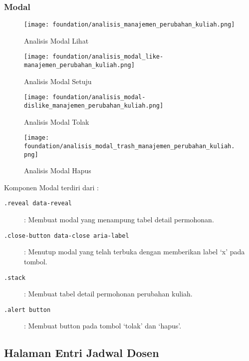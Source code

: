 \subsubsection{Modal}
\begin{figure} [H]
\centering  
\texttt{[image: foundation/analisis\_manajemen\_perubahan\_kuliah.png]}
\caption{Analisis Modal Lihat}
\end{figure}

\begin{figure} [H]
\centering  
\texttt{[image: foundation/analisis\_modal\_like-manajemen\_perubahan\_kuliah.png]}
\caption{Analisis Modal Setuju}
\end{figure}

\begin{figure} [H]
\centering  
\texttt{[image: foundation/analisis\_modal-dislike\_manajemen\_perubahan\_kuliah.png]}
\caption{Analisis Modal Tolak}
\end{figure}

\begin{figure} [H]
\centering  
\texttt{[image: foundation/analisis\_modal\_trash\_manajemen\_perubahan\_kuliah.png]}
\caption{Analisis Modal Hapus}
\end{figure}
Komponen Modal terdiri dari :
\begin{description}
	\item [\texttt{.reveal data-reveal}] : Membuat modal yang menampung tabel detail permohonan.
	\item [\texttt{.close-button data-close aria-label}] : Menutup modal yang telah terbuka dengan memberikan label `x' pada tombol.
	\item [\texttt{.stack}] :	Membuat tabel detail permohonan perubahan kuliah.
	\item [\texttt{.alert button}] : Membuat button pada tombol `tolak'  dan `hapus'.
\end{description}



\subsection{Halaman Entri Jadwal Dosen}

